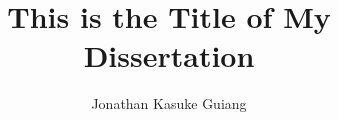 \documentclass[12pt]{ucsddissertation}
\title{This is the Title of My Dissertation}
\author{Jonathan Kasuke Guiang}
\begin{document}
\frontmatter
\maketitle
\makecopyright
\makesignature





\tableofcontents
\listoffigures
\listoftables









\mainmatter





\appendix
\Blinddocument

\backmatter

\end{document}
